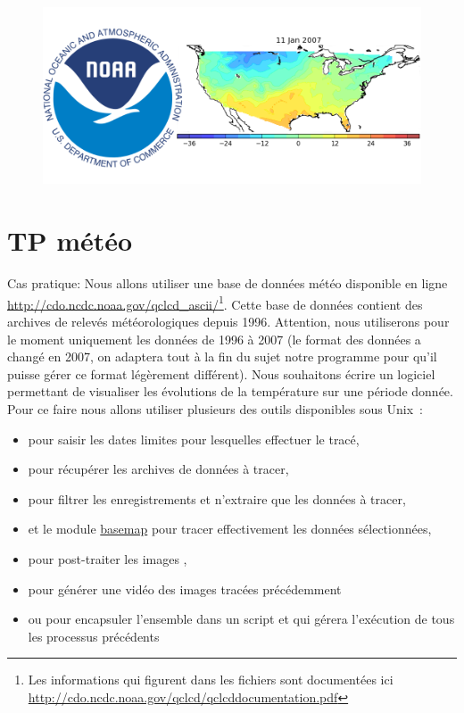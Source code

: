 
\begin{figure}[htbp]
\includegraphics[width=\linewidth]{Figs/logo_meteo.png}
\end{figure}

\section{TP météo}

Cas pratique: Nous allons utiliser une base de données météo
disponible en ligne
\url{http://cdo.ncdc.noaa.gov/qclcd_ascii/}\footnote{Les informations
  qui figurent dans les fichiers sont documentées ici
  \url{http://cdo.ncdc.noaa.gov/qclcd/qclcddocumentation.pdf}}. Cette
base de données contient des archives de relevés météorologiques depuis
1996. Attention, nous utiliserons pour le moment uniquement les
données de 1996 à 2007 (le format des données a changé en 2007,
on adaptera tout à la fin du sujet notre programme pour qu'il puisse
gérer ce format légèrement différent). Nous souhaitons écrire un logiciel permettant de visualiser les évolutions de la température sur une période
donnée. Pour ce faire nous allons utiliser plusieurs des outils
disponibles sous Unix~:
\begin{itemize}
\item \zenity pour saisir les dates limites pour lesquelles effectuer le tracé,
\item \wget pour récupérer les archives de données à tracer,
\item \awk pour filtrer les enregistrements et n'extraire que les
  données à tracer,
\item \python et le module \href{http://matplotlib.org/basemap/users/examples.html}{basemap} pour tracer effectivement les données sélectionnées,
\item \imagemagick pour post-traiter les images ,
\item \ffmpeg pour générer une vidéo des images tracées
  précédemment
\item \makefile ou \bashcmd pour encapsuler l'ensemble dans un script et
  qui gérera l'exécution de tous les processus précédents
\end{itemize}

